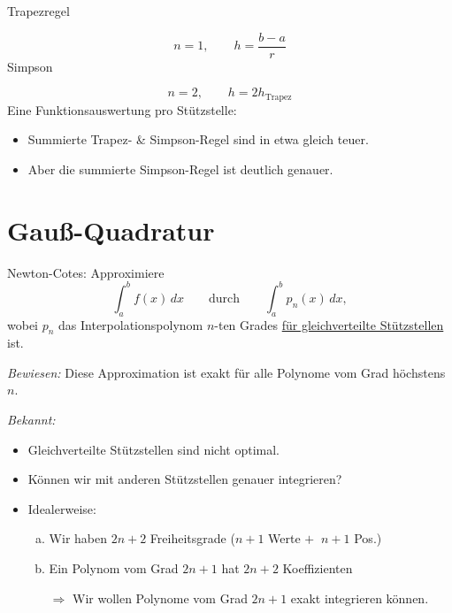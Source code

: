 Trapezregel \begin{center}
\end{center}
\begin{equation*}
n=1, \qquad  h = \frac{b-a}{r}
\end{equation*}
Simpson
\begin{center}
\end{center}
\begin{equation*}
n=2, \qquad h = 2 h_\text{Trapez}
\end{equation*}
Eine Funktionsauswertung pro Stützstelle:
\begin{itemize}
\renewcommand\labelitemi{$\rightarrow$}
\item Summierte Trapez- \& Simpson-Regel sind in etwa gleich teuer.
\item Aber die summierte Simpson-Regel ist deutlich genauer.
\end{itemize}

\section{Gauß-Quadratur}
Newton-Cotes: Approximiere
\begin{equation*}
 \int_a^b f(x)\,dx
 \qquad \text{durch} \qquad
 \int_a^b p_n(x)\,dx,
\end{equation*}
wobei $p_n$ das Interpolationspolynom $n$-ten Grades \underline{für gleichverteilte Stützstellen} ist.

\bigskip

\emph{Bewiesen:} Diese Approximation ist exakt für alle Polynome vom Grad höchstens $n$.

\medskip

\emph{Bekannt:}
\begin{itemize}
\item Gleichverteilte Stützstellen sind nicht optimal.
\item Können wir mit anderen Stützstellen genauer integrieren?
\item Idealerweise:
\begin{enumerate}[a)]
\item Wir haben $2n +2$ Freiheitsgrade ($n+1$ Werte $+ \;\; n+1$ Pos.)
\item Ein Polynom vom Grad $2n +1$ hat $2n+2$ Koeffizienten
\item[$\Rightarrow$] Wir wollen Polynome vom Grad $2n+1$ exakt integrieren können.
\end{enumerate}
\end{itemize}

